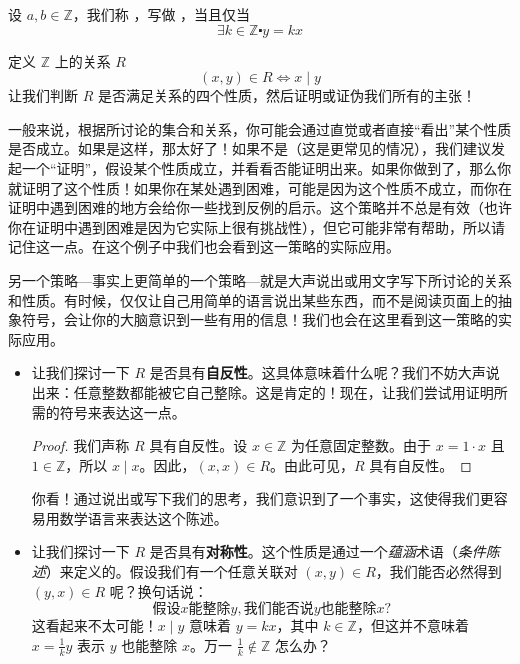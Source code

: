\begin{definition}\label{def:definition6.2.15}
    设 $a,b \in \mathbb{Z}$，我们称 ，写做 ，当且仅当
    \[\exists k \in \mathbb{Z} \centerdot y = kx\]
\end{definition}

\begin{example}
    定义 $\mathbb{Z}$ 上的关系 $R$
    \[(x, y) \in R \iff x \mid y\]
    让我们判断 $R$ 是否满足关系的四个性质，然后证明或证伪我们所有的主张！

    一般来说，根据所讨论的集合和关系，你可能会通过直觉或者直接``看出''某个性质是否成立。如果是这样，那太好了！如果不是（这是更常见的情况），我们建议发起一个``证明''，假设某个性质成立，并看看否能证明出来。如果你做到了，那么你就证明了这个性质！如果你在某处遇到困难，可能是因为这个性质不成立，而你在证明中遇到困难的地方会给你一些找到反例的启示。这个策略并不总是有效（也许你在证明中遇到困难是因为它实际上很有挑战性），但它可能非常有帮助，所以请记住这一点。在这个例子中我们也会看到这一策略的实际应用。

    另一个策略---事实上更简单的一个策略---就是大声说出或用文字写下所讨论的关系和性质。有时候，仅仅让自己用简单的语言说出某些东西，而不是阅读页面上的抽象符号，会让你的大脑意识到一些有用的信息！我们也会在这里看到这一策略的实际应用。

    \begin{itemize}
        \item 让我们探讨一下 $R$ 是否具有\textbf{自反性}。这具体意味着什么呢？我们不妨大声说出来：任意整数都能被它自己整除。这是肯定的！现在，让我们尝试用证明所需的符号来表达这一点。
        \begin{proof}
            我们声称 $R$ 具有自反性。设 $x \in \mathbb{Z}$ 为任意固定整数。由于 $x = 1 \cdot x$ 且 $1 \in \mathbb{Z}$，所以 $x \mid x$。因此，$(x, x) \in R$。由此可见，$R$ 具有自反性。
        \end{proof}
        你看！通过说出或写下我们的思考，我们意识到了一个事实，这使得我们更容易用数学语言来表达这个陈述。
        \item 让我们探讨一下 $R$ 是否具有\textbf{对称性}。这个性质是通过一个\emph{蕴涵}术语（\emph{条件陈述}）来定义的。假设我们有一个任意关联对 $(x, y) \in R$，我们能否必然得到 $(y, x) \in R$ 呢？换句话说：
        \[\text{假设} x \text{能整除} y, \text{我们能否说} y \text{也能整除} x \text{?} \]
        这看起来不太可能！$x \mid y$ 意味着 $y = kx$，其中 $k \in \mathbb{Z}$，但这并不意味着 $x = \frac{1}{k}y$ 表示 $y$ 也能整除 $x$。万一 $\frac{1}{k} \notin \mathbb{Z}$ 怎么办？


\end{itemize}
\end{example}
